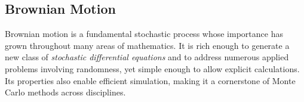
\subsection{Brownian Motion}\label{subsec:brownianmotion}

Brownian motion is a fundamental stochastic process whose importance has grown 
throughout many areas of mathematics. It is rich enough to generate a new class 
of \textit{stochastic differential equations} and to address numerous applied problems 
involving randomness, yet simple enough to allow explicit calculations. 
Its properties also enable efficient simulation, making it a cornerstone of Monte Carlo 
methods across disciplines.

